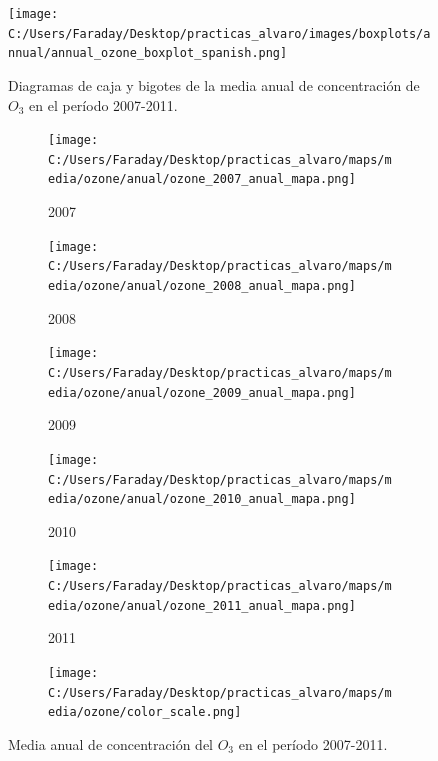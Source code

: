 \documentclass[12pt]{beamer}
\begin{document}
\begin{frame}[squeeze]
\begin{figure}[H]
\centering
\texttt{[image: C:/Users/Faraday/Desktop/practicas\_alvaro/images/boxplots/annual/annual\_ozone\_boxplot\_spanish.png]}
\caption{\scriptsize Diagramas de caja y bigotes de la media anual de concentración de $O_{3}$ en el período 2007-2011.}
\label{fig:box_ozone_annual}
\end{figure}

\begin{figure}[H]

\centering
\begin{subfigure}[H]{0.18\textwidth}
\texttt{[image: C:/Users/Faraday/Desktop/practicas\_alvaro/maps/media/ozone/anual/ozone\_2007\_anual\_mapa.png]}
\captionsetup{labelformat=empty}
\caption{\scriptsize 2007}
\end{subfigure}
%
\begin{subfigure}[H]{0.18\textwidth}
\texttt{[image: C:/Users/Faraday/Desktop/practicas\_alvaro/maps/media/ozone/anual/ozone\_2008\_anual\_mapa.png]}
\captionsetup{labelformat=empty}
\caption{\scriptsize 2008}
\end{subfigure}
%
\begin{subfigure}[H]{0.18\textwidth}
\texttt{[image: C:/Users/Faraday/Desktop/practicas\_alvaro/maps/media/ozone/anual/ozone\_2009\_anual\_mapa.png]}
\captionsetup{labelformat=empty}
\caption{\scriptsize 2009}
\end{subfigure}
%
\begin{subfigure}[H]{0.18\textwidth}
\texttt{[image: C:/Users/Faraday/Desktop/practicas\_alvaro/maps/media/ozone/anual/ozone\_2010\_anual\_mapa.png]}
\captionsetup{labelformat=empty}
\caption{\scriptsize 2010}
\end{subfigure}
%
\begin{subfigure}[H]{0.18\textwidth}
\texttt{[image: C:/Users/Faraday/Desktop/practicas\_alvaro/maps/media/ozone/anual/ozone\_2011\_anual\_mapa.png]}
\captionsetup{labelformat=empty}
\caption{\scriptsize 2011}
\end{subfigure}

\begin{subfigure}[H]{0.45\textwidth}
\texttt{[image: C:/Users/Faraday/Desktop/practicas\_alvaro/maps/media/ozone/color\_scale.png]}
\captionsetup{labelformat=empty}
\caption{}
\end{subfigure}

\vspace*{-7mm}
\caption{\scriptsize Media anual de concentración del $O_{3}$ en el período 2007-2011.}
\label{fig:map-ozone-anual}
\end{figure}
\end{frame}
\end{document}
